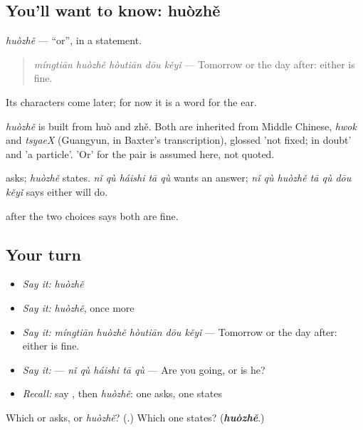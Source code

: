 \subsection*{You'll want to know: huòzhě}
\emph{huòzhě} — \textquotedblleft{}or\textquotedblright{}, in a statement.

\begin{quote}
\emph{míngtiān huòzhě hòutiān dōu kěyǐ} — Tomorrow or the day after: either is fine.
\end{quote}

Its characters come later; for now it is a word for the ear.

\begin{cousinweb}
\emph{huòzhě} is built from huò and zhě. Both are inherited from Middle Chinese, \emph{hwok} and \emph{tsyaeX} (Guangyun, in Baxter's transcription), glossed 'not fixed; in doubt' and 'a particle'. 'Or' for the pair is assumed here, not quoted.
\end{cousinweb}

\begin{grammarlens}[title={What you've built}]
 asks; \emph{huòzhě} states. \textbf{} \emph{nǐ qù háishi tā qù} wants an answer; \emph{nǐ qù huòzhě tā qù dōu kěyǐ} says either will do.

 after the two choices says both are fine.
\end{grammarlens}

\subsection*{Your turn}
\begin{itemize}
\raggedright
  \item \emph{Say it:} \emph{huòzhě}
  \item \emph{Say it:} \emph{huòzhě}, once more
  \item \emph{Say it:} \emph{míngtiān huòzhě hòutiān dōu kěyǐ} — Tomorrow or the day after: either is fine.
  \item \emph{Say it:}  — \emph{nǐ qù háishi tā qù} — Are you going, or is he?
  \item \emph{Recall:} say , then \emph{huòzhě}: one asks, one states
\end{itemize}

\begin{tcolorbox}[breakable,colback=teal!4,colframe=teal!35!black,title={Before you move on}]
Which or asks,  or \emph{huòzhě}? (\textbf{}.) Which one states? (\emph{\textbf{huòzhě}}.)
\end{tcolorbox}
